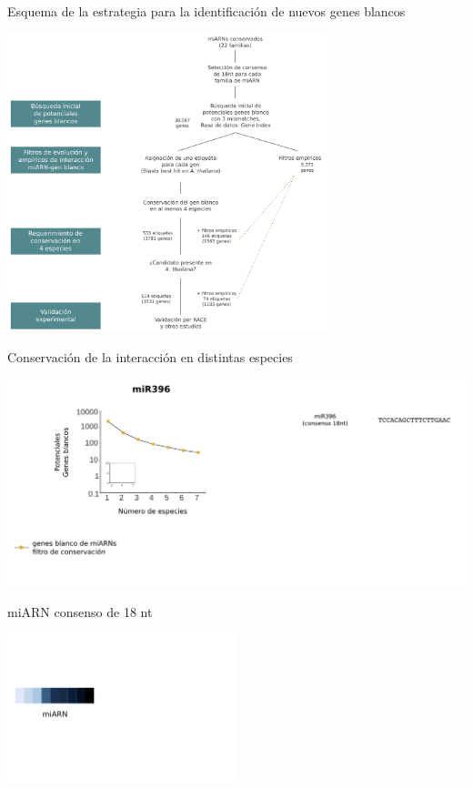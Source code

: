 \documentclass{beamer}
\begin{document}
\begin{frame}{Esquema de la estrategia para la identificación de nuevos genes blancos}
	\begin{center}
		\includegraphics[width=0.7\textwidth]{img/NAR_fig01_04.png}
	\end{center}
\end{frame}

\begin{frame}{Conservación de la interacción en distintas especies}
	\begin{center}
		\includegraphics[width=1\textwidth]{img/NAR_fig2_01.png}
	\end{center}
\end{frame}


\begin{frame}{miARN consenso de 18 nt}
	\begin{center}
		\includegraphics[width=0.5\textwidth]{img/shuffle_01.png}
	\end{center}
\end{frame}
\end{document}
